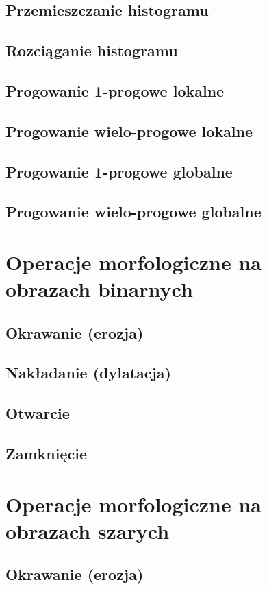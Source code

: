 \documentclass[a4paper,12pt]{book}
\begin{document}
\section{Przemieszczanie histogramu}
\section{Rozciąganie histogramu}
\section{Progowanie 1-progowe lokalne}
\section{Progowanie wielo-progowe lokalne}
\section{Progowanie 1-progowe globalne}
\section{Progowanie wielo-progowe globalne}

\chapter{Operacje morfologiczne na obrazach binarnych}
\section{Okrawanie (erozja)}
\section{Nakładanie (dylatacja)}
\section{Otwarcie}
\section{Zamknięcie}

\chapter{Operacje morfologiczne na obrazach szarych}
\section{Okrawanie (erozja)}
\end{document}
